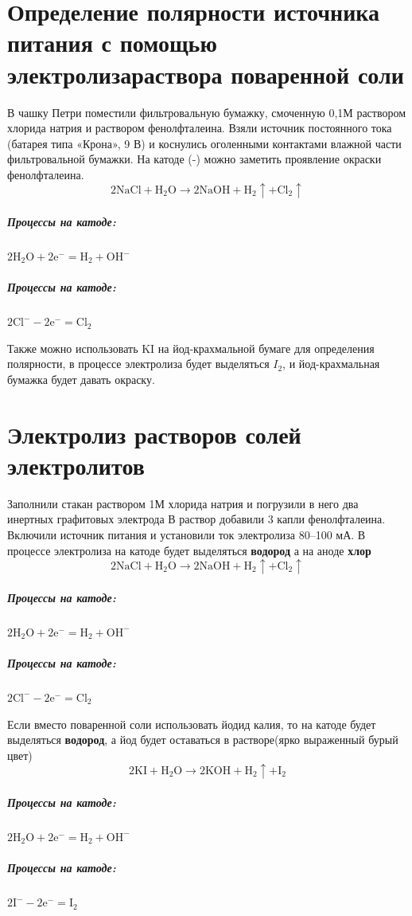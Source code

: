 \documentclass[a4paper,12pt]{article}
\begin{document}
\section{Определение полярности источника питания с помощью электролизараствора поваренной соли}
В чашку Петри поместили фильтровальную бумажку, смоченную 0,1М раствором хлорида натрия и раствором фенолфталеина. Взяли источник постоянного тока
(батарея типа «Крона», 9 В) и коснулись оголенными контактами влажной части фильтровальной бумажки. На катоде (-) можно заметить проявление окраски фенолфталеина. 
\begin{equation}
    \mathrm{2NaCl+H_2O \longrightarrow 2NaOH+H_2\uparrow + Cl_2\uparrow}
\end{equation}
\subparagraph{Процессы на катоде:} $\mathrm{2H_2O+2e^-=H_2+OH^-}$
\subparagraph{Процессы на катоде:} $\mathrm{2Cl^--2e^-=Cl_2}$


Также можно использовать KI на йод-крахмальной бумаге для определения полярности, в процессе электролиза будет выделяться $I_2$,  и йод-крахмальная бумажка будет давать окраску.

\section{Электролиз растворов солей электролитов}
Заполнили стакан раствором 1М хлорида натрия и погрузили в него два инертных графитовых электрода
 В раствор добавили 3 капли фенолфталеина. Включили источник питания и установили ток электролиза 80–100 мА. 
 В процессе электролиза на катоде будет выделяться \textbf{водород} а на аноде \textbf{хлор}
 \begin{equation}
    \mathrm{2NaCl+H_2O \longrightarrow 2NaOH+H_2\uparrow + Cl_2\uparrow}
\end{equation}
\subparagraph{Процессы на катоде:} $\mathrm{2H_2O+2e^-=H_2+OH^-}$
\subparagraph{Процессы на катоде:} $\mathrm{2Cl^--2e^-=Cl_2}$

Если вместо поваренной соли использовать йодид калия, то на катоде будет выделяться  \textbf{водород}, а йод будет оставаться в растворе(ярко выраженный бурый цвет)
\begin{equation}
    \mathrm{2KI+H_2O \longrightarrow 2KOH+H_2\uparrow + I_2}
\end{equation}
\subparagraph{Процессы на катоде:} $\mathrm{2H_2O+2e^-=H_2+OH^-}$
\subparagraph{Процессы на катоде:} $\mathrm{2I^--2e^-=I_2}$
\end{document}
